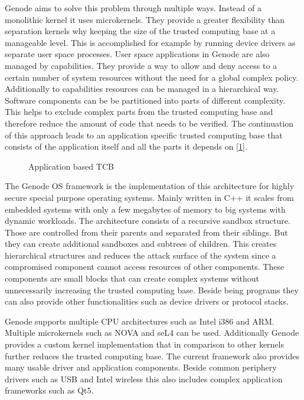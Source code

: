 \documentclass[
a4paper,
12pt,
notitlepage,
parskip=half,
DIV=11,
]{scrbook}
\begin{document}
		Genode aims to solve this problem through multiple ways.
		Instead of a monolithic kernel it uses microkernels.
		They provide a greater flexibility than separation kernels why keeping the size of the trusted computing base at a manageable level.
		This is accomplished for example by running device drivers as separate user space processes.
		User space applications in Genode are also managed by capabilities.
		They provide a way to allow and deny access to a certain number of system resources without the need for a global complex policy.
		Additionally to capabilities resources can be managed in a hierarchical way.
		Software components can be be partitioned into parts of different complexity.
		This helps to exclude complex parts from the trusted computing base and therefore reduce the amount of code that needs to be verified.
		The continuation of this approach leads to an application specific trusted computing base that consists of the application itself and all the parts it depends on [\ref{fig:tcb_tree}].
		\citep{genode}
		
		\begin{figure}
			\centering
			\def\svgwidth{\columnwidth}
			
			\caption{Application based TCB \citep{genode}}
			\label{fig:tcb_tree}
		\end{figure}
	
		The Genode OS framework is the implementation of this architecture for highly secure special purpose operating systems.
		Mainly written in C++ it scales from embedded systems with only a few megabytes of memory to big systems with dynamic workloads.
		The architecture consists of a recursive sandbox structure.
		Those are controlled from their parents and separated from their siblings.
		But they can create additional sandboxes and subtrees of children.
		This creates hierarchical structures and reduces the attack surface of the system since a compromised component cannot access resources of other components.
		These components are small blocks that can create complex systems without unnecessarily increasing the trusted computing base.
		Beside being programs they can also provide other functionalities such as device drivers or protocol stacks.
		
		Genode supports multiple CPU architectures such as Intel i386 and ARM.
		Multiple microkernels such as NOVA and seL4 can be used.
		Additionally Genode provides a custom kernel implementation that in comparison to other kernels further reduces the trusted computing base.
		The current framework also provides many usable driver and application components.
		Beside common periphery drivers such as USB and Intel wireless this also includes complex application frameworks such as Qt5. \citep{genode}
		
\end{document}
